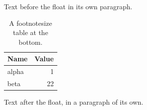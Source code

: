 \documentclass[12pt]{article}
\begin{document}
Text before the float in its own paragraph.

\begin{table}[b]
\footnotesize
\centering
\begin{tabular}{|l|r|}\hline Name & Value\\\hline alpha & 1\\ beta & 22\\\hline\end{tabular}
\caption{A footnotesize table at the bottom.}
\end{table}

Text after the float, in a paragraph of its own.
\end{document}
